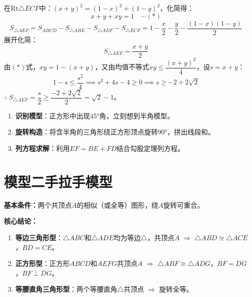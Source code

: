 \documentclass[12pt, a4paper]{ctexart}
\begin{document}
在$\mathrm{Rt}\triangle ECF$中：$(x+y)^2 = (1-x)^2 + (1-y)^2$，化简得：
\[
x + y + xy = 1 \quad \cdots (*)
\]
\[
S_{\triangle AEF} = S_{ABCD} - S_{\triangle ABE} - S_{\triangle ADF} - S_{\triangle ECF}
= 1 - \frac{x}{2} - \frac{y}{2} - \frac{(1-x)(1-y)}{2}
\]
展开化简：
\[
S_{\triangle AEF} = \frac{x+y}{2}
\]
由$(*)$式，$xy = 1 - (x+y)$，又由均值不等式$xy \leqslant \dfrac{(x+y)^2}{4}$，设$s = x+y$：
\[
1 - s \leqslant \frac{s^2}{4} \implies s^2 + 4s - 4 \geqslant 0 \implies s \geqslant -2 + 2\sqrt{2}
\]
$\therefore\ S_{\triangle AEF} = \dfrac{s}{2} \geqslant \dfrac{-2+2\sqrt{2}}{2} = \boxed{\sqrt{2} - 1}$。

\begin{tipbox}
\begin{enumerate}[label=\textbf{Step \arabic*}]
  \item \textbf{识别模型}：正方形中出现$45°$角，立刻想到半角模型。
  \item \textbf{旋转构造}：将含半角的三角形绕正方形顶点旋转$90°$，拼出线段和。
  \item \textbf{列方程求解}：利用$EF = BE + FD$结合勾股定理列方程。
\end{enumerate}
\end{tipbox}

\newpage
\section*{\textcolor{modelteal}{模型二\quad 手拉手模型}}

\begin{modelbox}
\textbf{基本条件：}两个共顶点$A$的相似（或全等）图形，绕$A$旋转可重合。

\textbf{核心结论：}
\begin{enumerate}[label=(\arabic*)]
  \item \textbf{等边三角形型}：$\triangle ABC$和$\triangle ADE$均为等边$\triangle$，共顶点$A$ $\Longrightarrow$ $\triangle ABD \cong \triangle ACE$，$BD = CE$。
  \item \textbf{正方形型}：正方形$ABCD$和$AEFG$共顶点$A$ $\Longrightarrow$ $\triangle ABF \cong \triangle ADG$，$BF = DG$，$BF \perp DG$。
  \item \textbf{等腰直角三角形型}：两个等腰直角$\triangle$共顶点 $\Longrightarrow$ 旋转全等。
\end{enumerate}
\end{modelbox}
\end{document}
